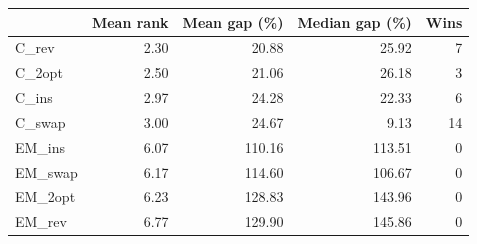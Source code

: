 \begin{tabular}{lrrrr}
\toprule
 & Mean rank & Mean gap (\%) & Median gap (\%) & Wins \\
\midrule
C\_rev & 2.30 & 20.88 & 25.92 & 7 \\
C\_2opt & 2.50 & 21.06 & 26.18 & 3 \\
C\_ins & 2.97 & 24.28 & 22.33 & 6 \\
C\_swap & 3.00 & 24.67 & 9.13 & 14 \\
EM\_ins & 6.07 & 110.16 & 113.51 & 0 \\
EM\_swap & 6.17 & 114.60 & 106.67 & 0 \\
EM\_2opt & 6.23 & 128.83 & 143.96 & 0 \\
EM\_rev & 6.77 & 129.90 & 145.86 & 0 \\
\bottomrule
\end{tabular}
